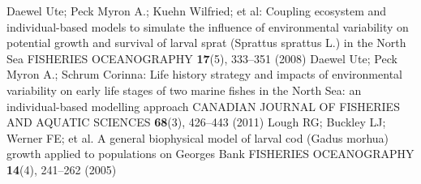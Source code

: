 \documentclass[dvips,a4,graphicx]{article}          %
\begin{document}
\begin{thebibliography}{99}
Daewel Ute; Peck Myron A.; Kuehn Wilfried; et al:
Coupling ecosystem and individual-based models to simulate the influence 
of environmental variability on potential growth and survival of larval sprat 
(Sprattus sprattus L.) in the North Sea
\newblock FISHERIES OCEANOGRAPHY \textbf{17}(5), 333--351 (2008)
Daewel Ute; Peck Myron A.; Schrum Corinna:
Life history strategy and impacts of environmental variability on early 
life stages of two marine fishes in the North Sea: an individual-based 
modelling approach
\newblock CANADIAN JOURNAL OF FISHERIES AND AQUATIC SCIENCES \textbf{68}(3), 426--443 (2011)
Lough RG; Buckley LJ; Werner FE; et al.
A general biophysical model of larval cod (Gadus morhua) growth applied to populations on Georges Bank
\newblock FISHERIES OCEANOGRAPHY  \textbf{14}(4), 241--262 (2005)
\end{thebibliography}

  
\end{document}
